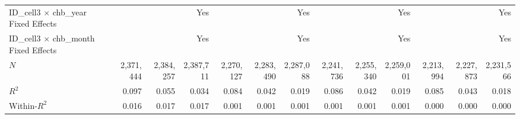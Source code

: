 \begin{tabular}{lrrrrrrrrrrrr}
ID\_cell3 $\times$ chb\_year Fixed Effects  &              &              &          Yes &              &              &          Yes &              &              &          Yes &              &              &          Yes \\ 
ID\_cell3 $\times$ chb\_month Fixed Effects &              &              &          Yes &              &              &          Yes &              &              &          Yes &              &              &          Yes \\ 
\midrule
$N$                                         &    2,371,444 &    2,384,257 &    2,387,711 &    2,270,127 &    2,283,490 &    2,287,088 &    2,241,736 &    2,255,340 &    2,259,001 &    2,213,994 &    2,227,873 &    2,231,566 \\ 
$R^2$                                       &        0.097 &        0.055 &        0.034 &        0.084 &        0.042 &        0.019 &        0.086 &        0.042 &        0.019 &        0.085 &        0.043 &        0.018 \\ 
Within-$R^2$                                &        0.016 &        0.017 &        0.017 &        0.001 &        0.001 &        0.001 &        0.001 &        0.001 &        0.001 &        0.000 &        0.000 &        0.000 \\ 
\bottomrule
\end{tabular}
